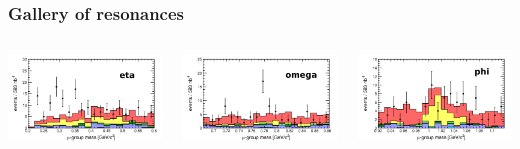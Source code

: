 \documentclass[compress]{beamer}
\begin{document}
\begin{frame}
\frametitle{Gallery of resonances}

\begin{columns}
\includegraphics[width=\linewidth]{Mu9_mass_eta.png}

\includegraphics[width=\linewidth]{Mu9_mass_omg.png}

\includegraphics[width=\linewidth]{Mu9_mass_phi.png}


\end{columns}
\end{frame}
\end{document}

